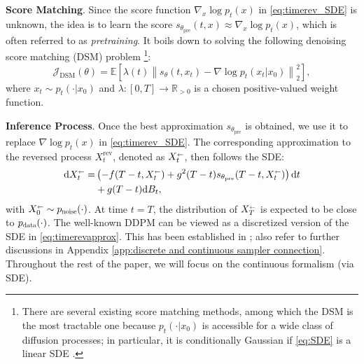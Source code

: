 \documentclass{article}
\theoremstyle{plain}
\theoremstyle{definition}
\theoremstyle{remark}
\newcommand\sla{\scaleobj{0.8}{\leftarrow}}
\begin{document}
\textbf{Score Matching}. 
Since the score function
$\nabla_x \log p_t(x)$ in \eqref{eq:timerev_SDE} is unknown, 
the idea is to learn the score $s_{\theta_{\text{pre}}}(t,x)\approx \nabla_x \log p_t(x)$, which is often referred to as {\em pretraining}.
It boils down to solving the following denoising score matching (DSM) problem \cite{vincent2011connection} \footnote{There are several existing score matching methods, among which the DSM is the most tractable one because $p_t(\cdot|x_0)$ is accessible for a wide class of diffusion processes; in particular, it is conditionally Gaussian if \eqref{eq:SDE} is a linear SDE \cite{Song20SGMbySDE}.}:
\begin{equation}
\label{eq:DSM objective}
\mathcal{J}_{\text{DSM}}(\theta) =\mathbb{E}\left[\lambda(t)\left\|s_{\theta}(t,x_t)-\nabla \log p_t(x_t|x_0)\right\|_2^2\right],
\end{equation}
where $x_t \sim p_t(\cdot|x_0)$ and $\lambda:[0, T] \rightarrow \mathbb{R}_{>0}$ is a chosen positive-valued weight function. 

\textbf{Inference Process}. Once the best approximation $s_{\theta_{\text{pre}}}$ is obtained, we use it to replace $\nabla \log p_t(x)$ in \eqref{eq:timerev_SDE}. The corresponding approximation to the reversed process $X^{\text{rev}}_t$, denoted as 
$X^{\sla}_t$, then follows the SDE:
\begin{align}
\label{eq:timerevapprox}
\mathrm{d} X^{\sla}_t = &\left(-f(T-t,X^{\sla}_t) + g^2(T-t) s_{\theta_{\text{pre}}}(T-t, X^{\sla}_t)  \right) \mathrm{d}t \nonumber\\
&+ g(T-t) \mathrm{d}B_t,
\end{align}
with $X^{\sla}_0\sim p_{\scalebox{0.7}{noise}}(\cdot)$. 
At time $t=T$,  the distribution of $X^{\sla}_T$ 
is expected to be close to $p_{\scalebox{0.7}{data}}(\cdot)$. 
The well-known DDPM \cite{Ho20DDPM}
can be viewed as a discretized version of the SDE in \eqref{eq:timerevapprox}.
This has been established in \cite{Song20SGMbySDE,salimans2022progressive,zhang2022fast,zhang2022gddim}; also refer to further discussions in Appendix \ref{app:discrete and continuous sampler connection}. 
Throughout the rest of the paper, we will focus on the continuous formalism (via SDE). 
\end{document}
